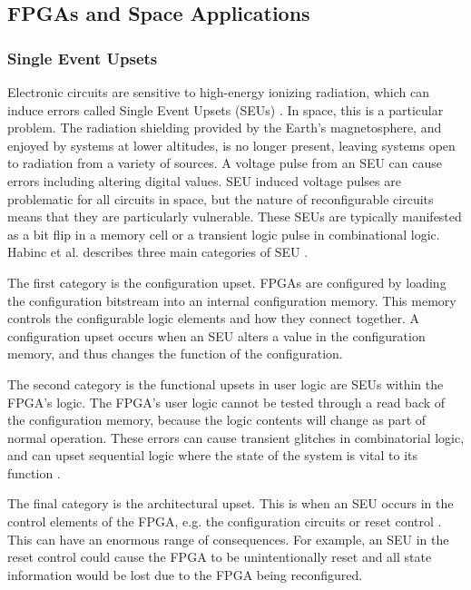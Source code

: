 \documentclass[12pt]{article}
\begin{document}
\subsection{FPGAs and Space Applications}
\label{sec:Background-FPGAsAndSpaceApplications}

\subsubsection{Single Event Upsets}
\label{sec:Background-FPGAsAndSpaceApplications-SEUs}

Electronic circuits are sensitive to high-energy ionizing radiation, which can induce errors called Single Event Upsets (SEUs) \cite{SeuTutorial}. In space, this is a particular problem. The radiation shielding provided by the Earth's magnetosphere, and enjoyed by systems at lower altitudes, is no longer present, leaving systems open to radiation from a  variety of sources. A voltage pulse from an SEU can cause errors including altering digital values. SEU induced voltage pulses are problematic for all circuits in space, but the nature of reconfigurable circuits means that they are particularly vulnerable. These SEUs are typically manifested as a bit flip in a memory cell or a transient logic pulse in combinational logic. Habinc et al. describes three main categories of SEU \cite{SuitabilityGaisler}.

The first category is the configuration upset. FPGAs are configured by loading the configuration bitstream into an internal configuration memory. This memory controls the configurable logic elements and how they connect together. A configuration upset occurs when an SEU alters a value in the configuration memory, and thus changes the function of the configuration. 

The second category is the functional upsets in user logic are SEUs within the FPGA's logic. The FPGA's user logic cannot be tested through a read back of the configuration memory, because the logic contents will change as part of normal operation. These errors can cause transient glitches in combinatorial logic, and can upset sequential logic where the state of the system is vital to its function \cite{FTripleMR}.

The final category is the architectural upset. This is when an SEU occurs in the control elements of the FPGA, e.g. the configuration circuits or reset control \cite{SuitabilityGaisler}. This can have an enormous range of consequences. For example, an SEU in the reset control could cause the FPGA to be unintentionally reset and all state information would be lost due to the FPGA being reconfigured.
\end{document}
